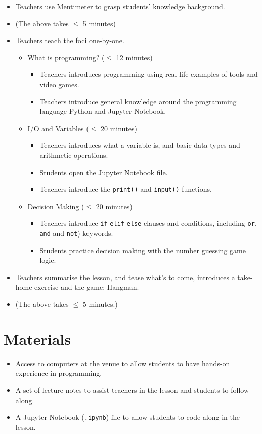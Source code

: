 \documentclass{article}
\def\T{Teachers }
\def\t{teachers }
\def\S{Students }
\def\s{students }
\begin{document}
\begin{itemize}
\item \T use Mentimeter to grasp students' knowledge background.

\item[] (The above takes $\leq$ 5 minutes)

\item \T teach the foci one-by-one.
	\begin{itemize}
		\item What is programming? ($\leq$ 12 minutes)
		\begin{itemize}
			\item \T introduces programming using real-life examples of tools and video games.
			\item \T introduce general knowledge around the programming language Python and Jupyter Notebook.
		\end{itemize}
		\item I/O and Variables ($\leq$ 20 minutes)
		\begin{itemize}
			\item \T introduces what a variable is, and basic data types and arithmetic operations.
			\item \S open the Jupyter Notebook file.
			\item \T introduce the \texttt{print()} and \texttt{input()} functions.
		\end{itemize}
		\item Decision Making ($\leq$ 20 minutes)
		\begin{itemize}
			\item \T introduce \texttt{if}-\texttt{elif}-\texttt{else} clauses and conditions, including \texttt{or}, \texttt{and} and \texttt{not}) keywords.
			\item \S practice decision making with the number guessing game logic.
		\end{itemize}
	\end{itemize}

\item \T summarise the lesson, and tease what's to come, introduces a take-home exercise and the game: Hangman.

\item[] (The above takes $\leq$ 5 minutes.)
\end{itemize} 

\section*{Materials}

\begin{itemize}
\item Access to computers at the venue to allow \s to have hands-on experience in programming.
\item A set of lecture notes to assist \t in the lesson and \s to follow along.
\item A Jupyter Notebook (\texttt{.ipynb}) file to allow \s to code along in the lesson.
\end{itemize}
\end{document}

